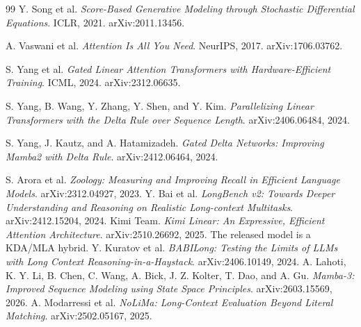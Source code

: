 \documentclass{article}
\theoremstyle{remark}\newtheorem{remark}[theorem]{Remark}
\begin{document}
\begin{thebibliography}{99}
 Y. Song et al. \emph{Score-Based Generative Modeling through Stochastic Differential Equations}. ICLR, 2021. arXiv:2011.13456.

 A. Vaswani et al. \emph{Attention Is All You Need}. NeurIPS, 2017. arXiv:1706.03762.

 S. Yang et al. \emph{Gated Linear Attention Transformers with Hardware-Efficient Training}. ICML, 2024. arXiv:2312.06635.

 S. Yang, B. Wang, Y. Zhang, Y. Shen, and Y. Kim. \emph{Parallelizing Linear Transformers with the Delta Rule over Sequence Length}. arXiv:2406.06484, 2024.

 S. Yang, J. Kautz, and A. Hatamizadeh. \emph{Gated Delta Networks: Improving Mamba2 with Delta Rule}. arXiv:2412.06464, 2024.

 S. Arora et al. \emph{Zoology: Measuring and Improving Recall in Efficient Language Models}. arXiv:2312.04927, 2023.
 Y. Bai et al. \emph{LongBench v2: Towards Deeper Understanding and Reasoning on Realistic Long-context Multitasks}. arXiv:2412.15204, 2024.
 Kimi Team. \emph{Kimi Linear: An Expressive, Efficient Attention Architecture}. arXiv:2510.26692, 2025. The released model is a KDA/MLA hybrid.
 Y. Kuratov et al. \emph{BABILong: Testing the Limits of LLMs with Long Context Reasoning-in-a-Haystack}. arXiv:2406.10149, 2024.
 A. Lahoti, K. Y. Li, B. Chen, C. Wang, A. Bick, J. Z. Kolter, T. Dao, and A. Gu. \emph{Mamba-3: Improved Sequence Modeling using State Space Principles}. arXiv:2603.15569, 2026.
 A. Modarressi et al. \emph{NoLiMa: Long-Context Evaluation Beyond Literal Matching}. arXiv:2502.05167, 2025.


\end{thebibliography}
\end{document}
